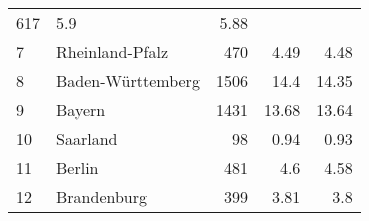 \begin{longtable}{lXrrr}
       \num{617} &
       \num[round-mode=places,round-precision=2]{5,9} &
         \num[round-mode=places,round-precision=2]{5,88} \\

     7 &
     \multicolumn{1}{X}{ Rheinland-Pfalz   } &


       \num{470} &
       \num[round-mode=places,round-precision=2]{4,49} &
         \num[round-mode=places,round-precision=2]{4,48} \\

     8 &
     \multicolumn{1}{X}{ Baden-Württemberg   } &


       \num{1506} &
       \num[round-mode=places,round-precision=2]{14,4} &
         \num[round-mode=places,round-precision=2]{14,35} \\

     9 &
     \multicolumn{1}{X}{ Bayern   } &


       \num{1431} &
       \num[round-mode=places,round-precision=2]{13,68} &
         \num[round-mode=places,round-precision=2]{13,64} \\

     10 &
     \multicolumn{1}{X}{ Saarland   } &


       \num{98} &
       \num[round-mode=places,round-precision=2]{0,94} &
         \num[round-mode=places,round-precision=2]{0,93} \\

     11 &
     \multicolumn{1}{X}{ Berlin   } &


       \num{481} &
       \num[round-mode=places,round-precision=2]{4,6} &
         \num[round-mode=places,round-precision=2]{4,58} \\

     12 &
     \multicolumn{1}{X}{ Brandenburg   } &


       \num{399} &
       \num[round-mode=places,round-precision=2]{3,81} &
         \num[round-mode=places,round-precision=2]{3,8} \\


\end{longtable}
